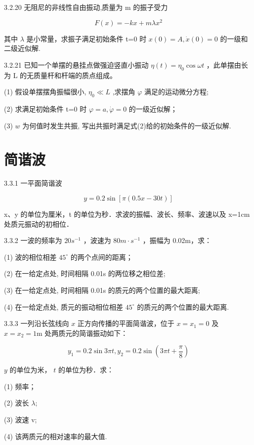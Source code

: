 \begin{problem}{3.2.20}
无阻尼的非线性自由振动,质量为 m 的振子受力

\[
F (x) = - k x + m \lambda x ^ {2}
\]

其中 $\lambda$ 是小常量，求振子满足初始条件 t=0 时 $x(0)=A,\dot{x}(0)=0$ 的一级和二级近似解.
\end{problem}
\clearpage


\begin{problem}{3.2.21}
已知一个单摆的悬挂点做强迫竖直小振动 $\eta(t)=\eta_{0}\cos\omega t$ ，此单摆由长为 L 的无质量杆和杆端的质点组成。

(1) 假设单摆摆角振幅很小, $\eta_{0}\ll L$ ,求摆角 $\varphi$ 满足的运动微分方程;

(2) 求满足初始条件 t=0 时 $\varphi=a,\dot{\varphi}=0$ 的一级近似解；

(3) $w$ 为何值时发生共振, 写出共振时满足式(2)给的初始条件的一级近似解.
\end{problem}
\clearpage


\section{简谐波}

\begin{problem}{3.3.1}
一平面简谐波

\[
y = 0. 2 \sin [ \pi (0. 5 x - 3 0 t) ]
\]

x、y 的单位为厘米，t 的单位为秒．求波的振幅、波长、频率、波速以及 x=1cm 处质元振动的初相位．
\end{problem}
\clearpage


\begin{problem}{3.3.2}
一波的频率为 $20s^{-1}$ ，波速为 $80m \cdot s^{-1}$ ，振幅为 0.02m，求：

(1) 波的相位相差 $45^{\circ}$ 的两个点间的距离；

(2) 在一给定点处, 时间相隔 0.01s 的两位移之相位差;

(3) 在一给定点处, 时间相隔 0.01s 的质元的两个位置的最大距离;

(4) 在一给定点处, 质元的振动相位相差 $45^{\circ}$ 的质元的两个位置的最大距离.
\end{problem}
\clearpage


\begin{problem}{3.3.3}
一列沿长弦线向 $x$ 正方向传播的平面简谐波，位于 $x = x_{1} = 0$ 及 $x = x_{2} = 1\mathrm{m}$ 处两质元的简谐振动如下：

\[
y _ {1} = 0. 2 \sin 3 \pi t, y _ {2} = 0. 2 \sin \left(3 \pi t + \frac {\pi}{8}\right)
\]

$y$ 的单位为米， $t$ 的单位为秒．求：

(1) 频率；

(2) 波长 $\lambda;$ 

(3) 波速 v;

(4) 该两质元的相对速率的最大值.
\begin{center}

\end{center}
\end{problem}
\clearpage


